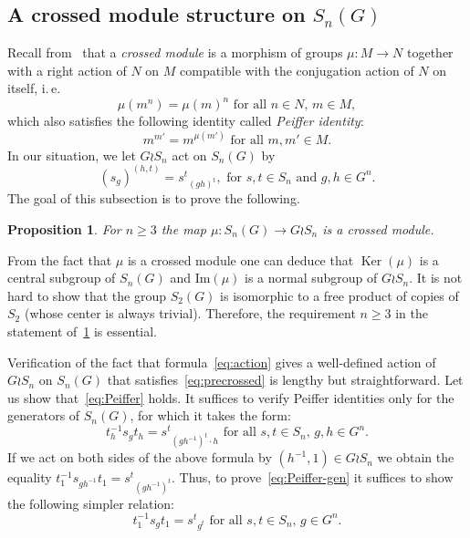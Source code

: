 \documentclass[oneside, 12pt]{amsart}
\theoremstyle{plain}
\numberwithin{equation}{section}
\numberwithin{lemma}{section}
\newtheorem{prop}[lemma]{Proposition}
\theoremstyle{remark}
\theoremstyle{definition}
\DeclareMathOperator{\Ker}{Ker}
\begin{document}
\subsection{A crossed module structure on $S_n(G)$}
Recall from~\cite[\S~2.2]{BHS11} that a {\it crossed module} is a morphism of groups $\mu\colon M\to N$ together with a right action of $N$ on $M$ 
compatible with the conjugation action of $N$ on itself, i.\,e.
\begin{equation} \label{eq:precrossed} \tag{CM1} \mu(m^n) = \mu(m)^n \text{ for all $n \in N$, $m \in M$}, \end{equation}
which also satisfies the following identity called {\it Peiffer identity}:
\begin{equation} \label{eq:Peiffer} \tag{CM2} m^{m'} = m^{\mu(m')} \text{ for all $m, m' \in M$}.\end{equation}
In our situation, we let $G \wr S_n$ act on $S_n(G)$ by 
\begin{equation} \label{eq:action} (s_g)^{(h, t)} = {s^t}_{(gh)^t}, \text{ for $s, t \in S_n$ and $g, h \in G^n$.} \end{equation}
The goal of this subsection is to prove the following.
\begin{prop} \label{thm:cms} For $n \geq 3$ the map $\mu \colon S_n(G) \to G \wr S_n $ is a crossed module. \end{prop}
From the fact that $\mu$ is a crossed module one can deduce that $\Ker(\mu)$ is a central subgroup of $S_n(G)$ and $\mathrm{Im}(\mu)$ is a normal subgroup of $G \wr S_n$.
It is not hard to show that the group $S_2(G)$ is isomorphic to a free product of copies of $S_2$ (whose center is always trivial).
Therefore, the requirement $n\geq 3$ in the statement of~\cref{thm:cms} is essential.

Verification of the fact that formula~\eqref{eq:action} gives a well-defined action of $G\wr S_n$ on $S_n(G)$ 
 that satisfies~\eqref{eq:precrossed} is lengthy but straightforward. Let us show that~\eqref{eq:Peiffer} holds. 
It suffices to verify Peiffer identities only for the generators of $S_n(G)$, for which it takes the form:
\begin{equation} \label{eq:Peiffer-gen} t^{-1}_h s_g t_h = {s^t}_{(gh^{-1})^t\cdot h} \text{ for all $s, t \in S_n$, $g, h\in G^n$.}\end{equation}
If we act on both sides of the above formula by $(h^{-1}, 1) \in G \wr S_n$ we obtain the equality
$t^{-1}_1 s_{gh^{-1}} t_1 = {s^t}_{(gh^{-1})^t}$.
Thus, to prove~\eqref{eq:Peiffer-gen} it suffices to show the following simpler relation:
\begin{equation} \label{eq:Peiffer-simple} t^{-1}_1 s_g t_1 = {s^t}_{g^t} \text{ for all $s, t \in S_n$, $g\in G^n$.}\end{equation}
\end{document}
